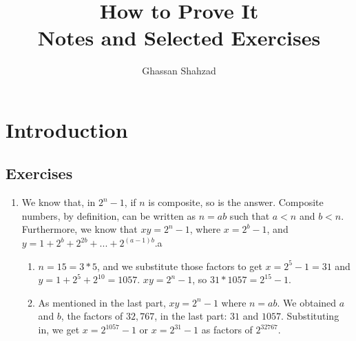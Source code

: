 \documentclass[a4paper, 11pt]{article}
\title{How to Prove It \\ Notes and Selected Exercises}
\author {Ghassan Shahzad}
\begin{document}
\section{Introduction}
\subsection{Exercises}
\begin{enumerate}
  \item We know that, in $2^n - 1$, if $n$ is composite, so is the answer. Composite numbers, by definition, can be written as $n = ab$ such that $a < n$ and $b < n$. Furthermore, we know that $xy = 2^n-1$, where $x = 2^b-1$, and $y = 1+2^b+2^{2b}+...+2^{(a-1)b}$.a
        \begin{enumerate}
          \item $n=15=3*5$, and we substitute those factors to get $x=2^5-1= 31$ and $y=1+2^5+2^{10}=1057$. $xy=2^n-1$, so $31*1057=2^{15}-1$.
          \item As mentioned in the last part, $xy = 2^n-1$ where $n=ab$. We obtained $a$ and $b$, the factors of $32,767$, in the last part: $31$ and $1057$. Substituting in, we  get $x=2^{1057}-1$ or $x= 2^{31} - 1$ as factors of $2^{32767}$.
        \end{enumerate}


\end{enumerate}
\end{document}
